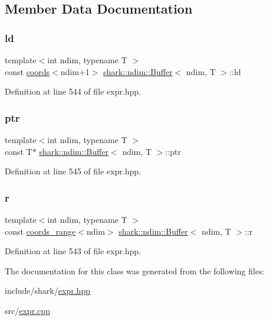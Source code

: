 \subsection{Member Data Documentation}
\hypertarget{classshark_1_1ndim_1_1_buffer_aa17fcbd807223fcb3cc5f211c32253d1}{}\label{classshark_1_1ndim_1_1_buffer_aa17fcbd807223fcb3cc5f211c32253d1} 
\subsubsection{\texorpdfstring{ld}{ld}}
{\footnotesize\ttfamily template$<$int ndim, typename T $>$ \\
const \hyperlink{structshark_1_1ndim_1_1coords}{coords}$<$ndim+1$>$ \hyperlink{classshark_1_1ndim_1_1_buffer}{shark\+::ndim\+::\+Buffer}$<$ ndim, T $>$\+::ld\hspace{0.3cm}{\ttfamily [private]}}



Definition at line 544 of file expr.\+hpp.

\hypertarget{classshark_1_1ndim_1_1_buffer_a0a63bf45d2f93a9670d736ae5123331a}{}\label{classshark_1_1ndim_1_1_buffer_a0a63bf45d2f93a9670d736ae5123331a} 
\subsubsection{\texorpdfstring{ptr}{ptr}}
{\footnotesize\ttfamily template$<$int ndim, typename T $>$ \\
const T$\ast$ \hyperlink{classshark_1_1ndim_1_1_buffer}{shark\+::ndim\+::\+Buffer}$<$ ndim, T $>$\+::ptr\hspace{0.3cm}{\ttfamily [private]}}



Definition at line 545 of file expr.\+hpp.

\hypertarget{classshark_1_1ndim_1_1_buffer_adf5e1304ce98553284cf98e88e6c24e0}{}\label{classshark_1_1ndim_1_1_buffer_adf5e1304ce98553284cf98e88e6c24e0} 
\subsubsection{\texorpdfstring{r}{r}}
{\footnotesize\ttfamily template$<$int ndim, typename T $>$ \\
const \hyperlink{structshark_1_1ndim_1_1coords__range}{coords\+\_\+range}$<$ndim$>$ \hyperlink{classshark_1_1ndim_1_1_buffer}{shark\+::ndim\+::\+Buffer}$<$ ndim, T $>$\+::r\hspace{0.3cm}{\ttfamily [private]}}



Definition at line 543 of file expr.\+hpp.



The documentation for this class was generated from the following files\+:\begin{DoxyCompactItemize}
\item 
include/shark/\hyperlink{expr_8hpp}{expr.\+hpp}\item 
src/\hyperlink{expr_8cpp}{expr.\+cpp}\end{DoxyCompactItemize}

